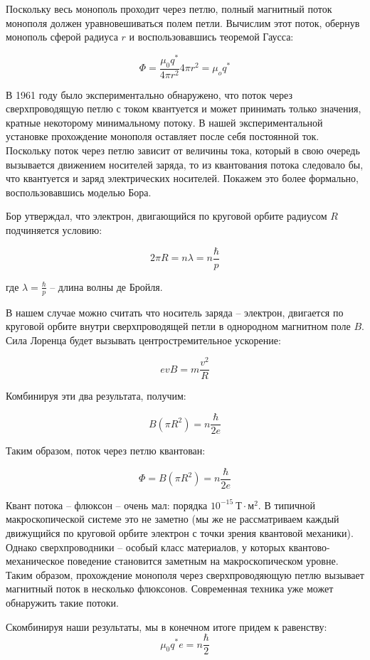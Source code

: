 \documentclass[a4paper, 12pt]{article}
\begin{document}
Поскольку весь монополь проходит через петлю, полный магнитный поток монополя должен уравновешиваться полем петли. Вычислим этот поток, обернув монополь сферой радиуса $r$ и воспользовавшись теоремой Гаусса:

\[
    \Phi = \frac{\mu_0 q^*}{4 \pi r^2}4\pi r^2 = \mu_o q^*
\]

В 1961 году было экспериментально обнаружено, что поток через сверхпроводящую петлю с током квантуется и может принимать только значения, кратные некоторому минимальному потоку. В нашей экспериментальной установке прохождение монополя оставляет после себя постоянной ток. Поскольку поток через петлю зависит от величины тока, который в свою очередь вызывается движением носителей заряда, то из квантования потока следовало бы, что квантуется и заряд электрических носителей. Покажем это более формально, воспользовавшись моделью Бора. 

Бор утверждал, что электрон, двигающийся по круговой орбите радиусом $R$ подчиняется условию:

\[
    2\pi R = n \lambda = n \frac{\hbar}{p}  
\]

где $\lambda = \frac{\hbar}{p}$ -- длина волны де Бройля. 

В нашем случае можно считать что носитель заряда -- электрон, двигается по круговой орбите внутри сверхпроводящей петли в однородном магнитном поле $B$. Сила Лоренца будет вызывать центростремительное ускорение:

\[
    evB = m\frac{v^2}{R}  
\]

Комбинируя эти два результата, получим:

\[
    B(\pi R^2) = n \frac{\hbar}{2e}
\]

Таким образом, поток через петлю квантован:

\[
    \Phi = B(\pi R^2) = n \frac{\hbar}{2e}
\]

Квант потока -- флюксон -- очень мал: порядка $10^{-15}~Т\cdot м^2$. В типичной макроскопической системе это не заметно (мы же не рассматриваем каждый движущийся по круговой орбите электрон с точки зрения квантовой механики). Однако сверхпроводники -- особый класс материалов, у которых квантово-механическое поведение становится заметным на макроскопическом уровне. Таким образом, прохождение монополя через сверхпроводяющую петлю вызывает магнитный поток в несколько флюксонов. Современная техника уже может обнаружить такие потоки.

Скомбинируя наши результаты, мы в конечном итоге придем к равенству:
\[
    \mu_0 q^* e = n \frac{\hbar}{2}
\]
\end{document}
